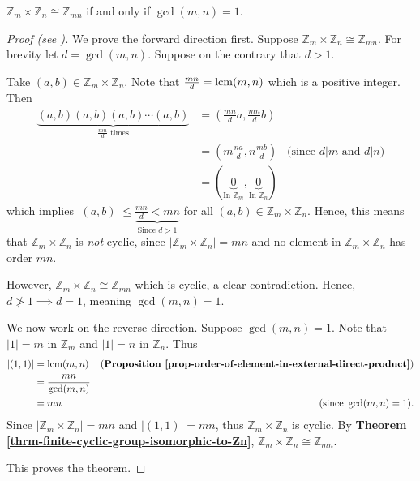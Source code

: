 \begin{theorem}\label{thrm-Zm-cross-Zn-isomorphic-to-Zmn-condition}
    $\mathbb{Z}_m \times \mathbb{Z}_n \cong \mathbb{Z}_{mn}$ if and only if $\gcd(m,n) = 1$.
\end{theorem}
\begin{proof}[Proof (see {\cite[Proposition 13.1 (3)]{humphreys_1996}})]
    We prove the forward direction first. Suppose $\mathbb{Z}_m \times \mathbb{Z}_n \cong \mathbb{Z}_{mn}$. For brevity let $d = \gcd(m,n)$. Suppose on the contrary that $d > 1$.

    Take $(a, b) \in \mathbb{Z}_m \times \mathbb{Z}_n$. Note that $\frac{mn}{d} = \mathrm{lcm}(m,n)$ which is a positive integer. Then
    \begin{align*}
        \underbrace{(a,b)(a,b)(a,b)\cdots(a,b)}_{\frac{mn}{d}\text{ times}}    &= \left(\frac{mn}{d}a, \frac{mn}{d}b\right)\\
        &= \left(m\frac{na}{d}, n\frac{mb}{d}\right) & \text{(since } d | m \text{ and } d | n)\\
        &= (\underbrace{0}_{\text{In } \mathbb{Z}_m}, \underbrace{0}_{\text{In } \mathbb{Z}_n})
    \end{align*}
    which implies $|(a, b)| \leq \underbrace{\frac{mn}{d} < mn}_{\text{Since } d > 1}$ for all $(a, b) \in \mathbb{Z}_m \times \mathbb{Z}_n$. Hence, this means that $\mathbb{Z}_m \times \mathbb{Z}_n$ is \textit{not} cyclic, since $|\mathbb{Z}_m \times \mathbb{Z}_n| = mn$ and no element in $\mathbb{Z}_m \times \mathbb{Z}_n$ has order $mn$.

    However, $\mathbb{Z}_m \times \mathbb{Z}_n \cong \mathbb{Z}_{mn}$ which is cyclic, a clear contradiction. Hence, $d \not>1 \implies d = 1$, meaning $\gcd(m,n) = 1$.

    We now work on the reverse direction. Suppose $\gcd(m,n) = 1$. Note that $|1| = m$ in $\mathbb{Z}_m$ and $|1| = n$ in $\mathbb{Z}_n$. Thus
    \begin{align*}
        |(1, 1)| &= \mathrm{lcm}(m, n) & \text{(\textbf{Proposition \ref{prop-order-of-element-in-external-direct-product}})}\\
        &= \frac{mn}{\gcd(m,n)}\\
        &= mn & \text{(since }\gcd(m,n) = 1).
    \end{align*}
    Since $|\mathbb{Z}_m \times \mathbb{Z}_n| = mn$ and $|(1,1)| = mn$, thus $\mathbb{Z}_m \times \mathbb{Z}_n$ is cyclic. By \textbf{Theorem \ref{thrm-finite-cyclic-group-isomorphic-to-Zn}}, $\mathbb{Z}_m \times \mathbb{Z}_n \cong \mathbb{Z}_{mn}$.

    This proves the theorem.
\end{proof}

